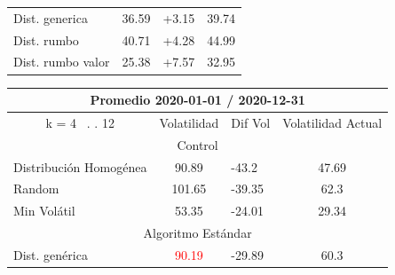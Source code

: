 \documentclass[12pt,a4paper]{article}
\begin{document}
\begin{table}[H]
\begin{tabular}{l|c|l|c|}
\hline
\rowcolor[rgb]{0.925,0.957,1} Dist. generica                           & 36.59                             & +3.15                             & 39.74                              \\
\rowcolor[rgb]{0.855,0.91,0.988} Dist. rumbo                           & 40.71                             & +4.28                             & 44.99                              \\
\rowcolor[rgb]{0.925,0.957,1} Dist. rumbo valor                        & \textcolor[rgb]{0,0.502,0}{25.38} & +7.57                             & \textcolor[rgb]{0,0.502,0}{32.95} 
\end{tabular}
\end{table}

\begin{table}[H]
\centering
\begin{tabular}{l|c|l|c|} 
\hline
\multicolumn{4}{c}{{\cellcolor[rgb]{0.635,0.647,0.788}}Promedio 2020-01-01 / 2020-12-31}                                                                                             \\ 
\hline
\multicolumn{1}{c|}{{\cellcolor[rgb]{0.635,0.647,0.788}}k = 4~ . . 12} & Volatilidad                       & Dif Vol                            & Volatilidad Actual                 \\ 
\hline
\multicolumn{4}{c}{{\cellcolor[rgb]{0.796,0.808,0.984}}Control}                                                                                                                      \\ 
\hline
\rowcolor[rgb]{0.925,0.957,1} Distribución Homogénea                   & 90.89                             & -43.2                              & 47.69                              \\
\rowcolor[rgb]{0.855,0.91,0.988} Random                                & 101.65                            & -39.35                             & 62.3                               \\
\rowcolor[rgb]{0.925,0.957,1} Min Volátil                              & 53.35                             & -24.01                             & 29.34                              \\ 
\hline
\multicolumn{4}{c}{{\cellcolor[rgb]{0.796,0.808,0.984}}Algoritmo Estándar}                                                                                                           \\ 
\hline
\rowcolor[rgb]{0.925,0.957,1} Dist. genérica                           & \textcolor{red}{90.19}            & -29.89                             & 60.3                               \\

\end{tabular}
\end{table}
\end{document}
